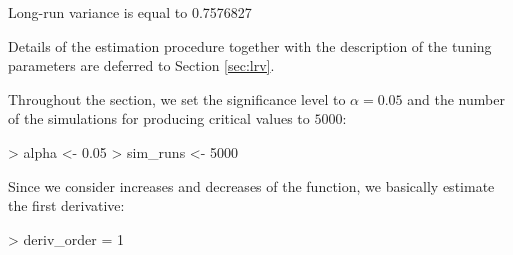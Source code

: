 \documentclass[a4paper]{scrartcl}
\begin{document}
\begin{Schunk}
\begin{Soutput}
Long-run variance is equal to  0.7576827 
\end{Soutput}
\end{Schunk}

Details of the estimation procedure together with the description of the tuning parameters are deferred to Section \ref{sec:lrv}.

Throughout the section, we set the significance level to $$ and the number of the simulations for producing critical values to $5000$:

\begin{Schunk}
\begin{Sinput}
> alpha    <- 0.05
> sim_runs <- 5000
\end{Sinput}
\end{Schunk}

Since we consider increases and decreases of the function, we basically estimate the first derivative:

\begin{Schunk}
\begin{Sinput}
> deriv_order = 1
\end{Sinput}
\end{Schunk}
\end{document}
